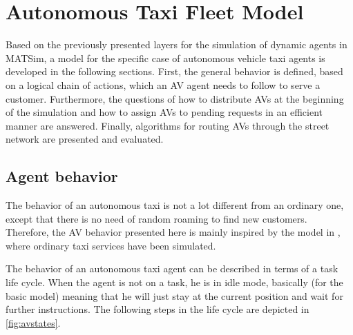 \section{Autonomous Taxi Fleet Model}
\label{sec:avmodel}

Based on the previously presented layers for the simulation of dynamic agents in
MATSim, a model for the specific case of autonomous vehicle taxi agents is developed
in the following sections. First, the general behavior is defined, based on a
logical chain of actions, which an AV agent needs to follow to serve a customer.
Furthermore, the questions of how to distribute AVs at the beginning of the simulation
and how to assign AVs to pending requests in an efficient manner are answered.
Finally, algorithms for routing AVs through the street network are presented and
evaluated.

\subsection{Agent behavior}

The behavior of an autonomous taxi is not a lot different from an ordinary one,
except that there is no need of random roaming to find new customers. Therefore,
the AV behavior presented here is mainly inspired by the model in \citet{Maciejewski2015}, where
ordinary taxi services have been simulated.

The behavior of an autonomous taxi agent can be described in terms of a task life
cycle. When the agent is not on a task, he is in idle mode, basically (for the basic
model) meaning that he will just stay at the current position and wait for further
instructions. The following steps in the life cycle are depicted in \cref{fig:avstates}.

